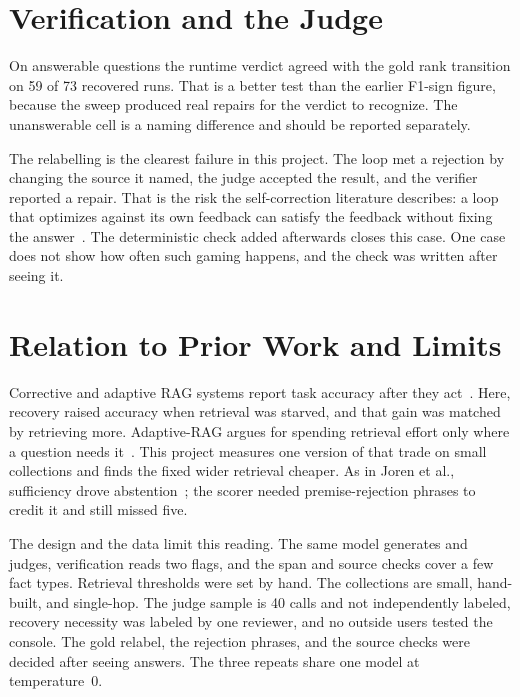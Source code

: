 \documentclass[12pt, a4paper, oneside]{report}
\newcommand{\code}[1]{\texttt{\detokenize{#1}}}
\begin{document}
\section{Verification and the Judge}

On answerable questions the runtime verdict agreed with the gold rank
transition on 59 of 73 recovered runs. That is a better test than the
earlier F1-sign figure, because the sweep produced real repairs for the
verdict to recognize. The unanswerable cell is a naming difference and
should be reported separately.

The \code{gold-029} relabelling is the clearest failure in this project.
The loop met a rejection by changing the source it named, the judge
accepted the result, and the verifier reported a repair. That is the risk
the self-correction literature describes: a loop that optimizes against its
own feedback can satisfy the feedback without fixing the
answer~\cite{huang2024cannot,kamoi2024selfcorrection}. The deterministic
check added afterwards closes this case. One case does not show how often
such gaming happens, and the check was written after seeing it.

\section{Relation to Prior Work and Limits}

Corrective and adaptive RAG systems report task accuracy after they
act~\cite{yan2024crag,asai2024selfrag,jiang2023flare,jeong2024adaptiverag}.
Here, recovery raised accuracy when retrieval was starved, and that gain
was matched by retrieving more. Adaptive-RAG argues for spending retrieval
effort only where a question needs it~\cite{jeong2024adaptiverag}. This
project measures one version of that trade on small collections and finds
the fixed wider retrieval cheaper. As in Joren et al., sufficiency
drove abstention~\cite{joren2025sufficient}; the scorer needed
premise-rejection phrases to credit it and still missed five.

The design and the data limit this reading. The same model generates and
judges, verification reads two flags, and the span and source checks cover
a few fact types. Retrieval thresholds were set by hand. The collections are
small, hand-built, and single-hop. The judge sample is 40 calls and not
independently labeled, recovery necessity was labeled by one reviewer, and
no outside users tested the console.
The gold relabel, the rejection phrases, and the source checks were decided
after seeing answers. The three repeats share one model at temperature~0.
\end{document}
